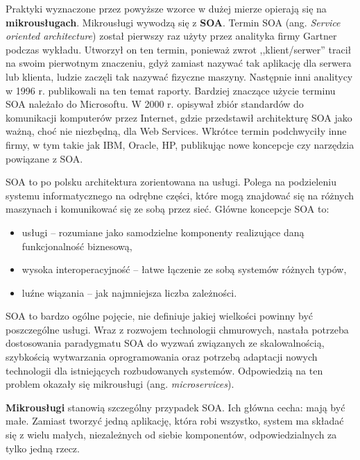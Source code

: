 \documentclass[12pt,a4paper,twoside,titlepage,openright]{book}
\begin{document}
Praktyki wyznaczone przez powyższe wzorce w dużej mierze opierają się na \textbf{mikrousługach}. Mikrousługi wywodzą się z \textbf{SOA}. Termin SOA (ang. \textit{Service oriented architecture}) został pierwszy raz użyty przez analityka firmy Gartner podczas wykładu. Utworzył on ten termin, ponieważ zwrot ,,klient/serwer'' tracił na swoim pierwotnym znaczeniu, gdyż zamiast nazywać tak aplikację dla serwera lub klienta, ludzie zaczęli tak nazywać fizyczne maszyny. Następnie inni analitycy w 1996 r. publikowali na ten temat raporty. Bardziej znaczące użycie terminu SOA należało do Microsoftu. W 2000 r. opisywał zbiór standardów do komunikacji komputerów przez Internet, gdzie przedstawił architekturę SOA jako ważną, choć nie niezbędną, dla Web Services. Wkrótce termin podchwyciły inne firmy, w tym  takie jak IBM, Oracle, HP, publikując nowe koncepcje czy narzędzia powiązane z SOA. \cite{soaOreily}

SOA to po polsku architektura zorientowana na usługi. Polega na podzieleniu systemu informatycznego na odrębne części, które mogą znajdować się na różnych maszynach i komunikować się ze sobą przez sieć. Główne koncepcje SOA to: 
\begin{itemize}
\item usługi -- rozumiane jako samodzielne komponenty realizujące daną funkcjonalność biznesową,
\item wysoka interoperacyjność -- łatwe łączenie ze sobą systemów różnych typów,
\item luźne wiązania -- jak najmniejsza liczba zależności. \cite{soaOreily}
\end{itemize}

SOA to bardzo ogólne pojęcie, nie definiuje jakiej wielkości powinny być poszczególne usługi. Wraz z rozwojem technologii chmurowych, nastała potrzeba dostosowania paradygmatu SOA do wyzwań związanych ze skalowalnością, szybkością wytwarzania oprogramowania oraz potrzebą adaptacji nowych technologii dla istniejących rozbudowanych systemów. Odpowiedzią na ten problem okazały się mikrousługi (ang. \textit{microservices}).

\textbf{Mikrousługi} stanowią szczególny przypadek SOA. Ich główna cecha: mają być małe. Zamiast tworzyć jedną aplikację, która robi wszystko, system ma składać się z wielu małych, niezależnych od siebie komponentów, odpowiedzialnych za tylko jedną rzecz. \cite{microservicesPacktNetCore}
\end{document}
